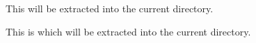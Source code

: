 

This  will be extracted into the current directory.

This is  which will be extracted into the current directory.


\bye
